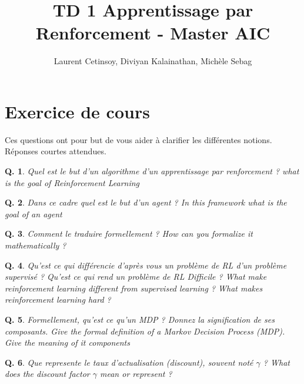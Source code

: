 \documentclass[a4paper]{exam}
\title{TD 1 Apprentissage par Renforcement - Master AIC}
\author{Laurent Cetinsoy, Diviyan Kalainathan, Michèle Sebag}
\newtheorem{question}{{\bf Q.}}[section]
\begin{document}
\maketitle

\section{Exercice de cours}

Ces questions ont pour but de vous aider à clarifier les différentes notions. Réponses courtes attendues.


\begin{question}

Quel est le but d'un algorithme d'un apprentissage par renforcement ? \em{what is the goal of Reinforcement Learning}

\end{question}


\begin{question}

Dans ce cadre quel est le but d'un agent ? \em{In this framework what is the goal of an agent}

\end{question}

\begin{question}
Comment le traduire formellement ? \em{How can you formalize it mathematically ?}

\end{question}

\begin{question}
	Qu'est ce qui différencie d'après vous un problème de RL d'un problème supervisé ? Qu'est ce qui rend un problème de RL Difficile ? \em{What make reinforcement learning different from supervised learning ? What makes reinforcement learning hard ?}
\end{question}

\begin{question}

Formellement, qu'est ce qu'un MDP ? Donnez la signification de ses composants. \em{Give the formal definition of a Markov Decision Process (MDP). Give the meaning of it components}

\end{question}

\begin{question}
	Que represente le taux d'actualisation (discount), souvent noté $\gamma$ ? \em{What does the discount factor $\gamma$ mean or represent ?}
\end{question}
\end{document}
